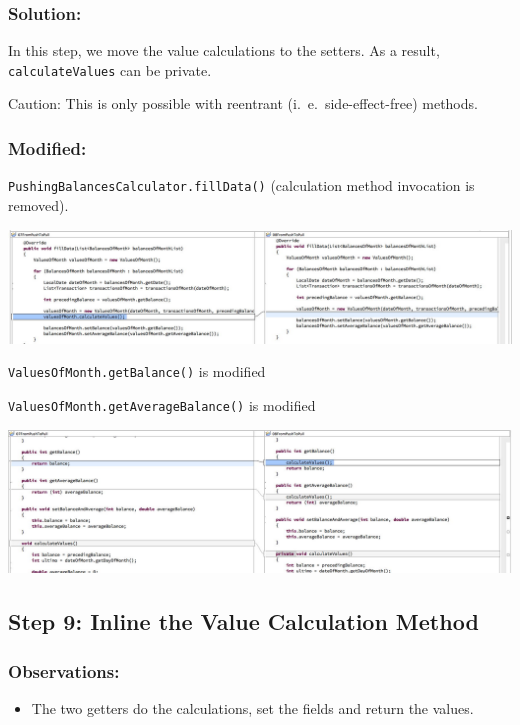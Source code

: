\documentclass[a4paper,fleqn,titlepage,11pt]{article}
\begin{document}
\subsubsection*{Solution:}
In this step, we move the value calculations to the setters. As a result, \texttt{calculateValues} can be private.

Caution: This is only possible with reentrant (i.~e.~side-effect-free) methods.

\subsubsection*{Modified:}

\texttt{PushingBalancesCalculator.fillData()} (calculation method invocation is removed).

\includegraphics[width=1\textwidth]{CompareViews/07-08-1.jpg}

\texttt{ValuesOfMonth.getBalance()} is modified

\texttt{ValuesOfMonth.getAverageBalance()} is modified


\includegraphics[width=1\textwidth]{CompareViews/07-08-2.jpg}



\subsection*{Step 9: Inline the Value Calculation Method}

\subsubsection*{Observations:}
\begin{itemize}
\item The two getters do the calculations, set the fields and return the values. 
\end{itemize}
\end{document}

